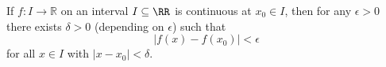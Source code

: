 

\begin{theorem}
If $f:I\to\mathbb R$ on an interval $I\subseteq \RR$ is continuous 
at $x_0\in I$, then for any $\epsilon>0$ there exists $\delta>0$ 
(depending on $\epsilon$) such that 
$$
|f(x)-f(x_0)| < \epsilon
$$
for all $x\in I$ with $|x-x_0|<\delta$.
\end{theorem}

